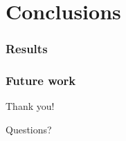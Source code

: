 \documentclass{beamer}
\begin{document}
    \section{Conclusions}
    \label{sec:conclusions}
        \frame{\sectionpage}

        \begin{frame}
            \frametitle{Results}
        \end{frame}

        \begin{frame}
            \frametitle{Future work}
        \end{frame}


        \begin{frame}[plain]
            \begin{center}
                \par{\Huge{Thank you!}}
                \vspace{2.0cm}
                \par{\Huge{Questions?}}
            \end{center}
        \end{frame}
\end{document}
